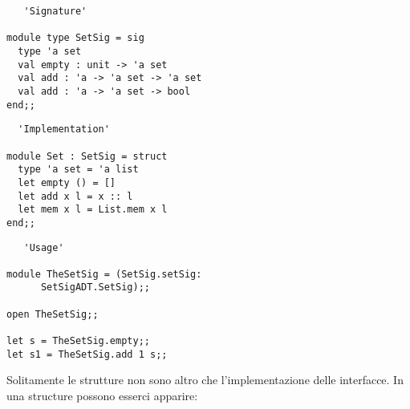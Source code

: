 \documentclass{article}
\begin{document}
\begin{minipage}{0.3\textwidth}
\begin{verbatim}
   'Signature'

module type SetSig = sig
  type 'a set
  val empty : unit -> 'a set
  val add : 'a -> 'a set -> 'a set
  val add : 'a -> 'a set -> bool
end;;
\end{verbatim}
\end{minipage}
\begin{minipage}{0.3\textwidth}
\begin{verbatim}
  'Implementation'

module Set : SetSig = struct
  type 'a set = 'a list
  let empty () = []
  let add x l = x :: l
  let mem x l = List.mem x l
end;;
\end{verbatim}
\end{minipage}
\begin{minipage}{0.3\textwidth}
\begin{verbatim}
   'Usage'

module TheSetSig = (SetSig.setSig: 
      SetSigADT.SetSig);;

open TheSetSig;;

let s = TheSetSig.empty;;
let s1 = TheSetSig.add 1 s;;
\end{verbatim}
\end{minipage}

\vspace*{0.5cm}

\hspace*{0.5cm}Solitamente le strutture non sono altro che l'implementazione delle interfacce.
In una structure possono esserci apparire:

\vspace*{0.5cm}
\end{document}

